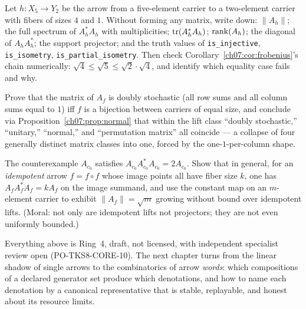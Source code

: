 \begin{exercise}\label{ch07:ex:exercise1}
Let $h:X_5\to Y_2$ be the arrow from a five-element carrier to a two-element
carrier with fibers of sizes $4$ and $1$. Without forming any matrix, write
down: $\lVert A_h\rVert$; the full spectrum of $A_h^*A_h$ with
multiplicities; $\mathrm{tr}(A_h^*A_h)$; $\mathrm{rank}(A_h)$; the diagonal of
$A_hA_h^*$; the support projector; and the truth values of
\texttt{is\_injective}, \texttt{is\_isometry},
\texttt{is\_partial\_isometry}. Then check
Corollary~\ref{ch07:cor:frobenius}'s chain numerically:
$\sqrt{4}\le\sqrt{5}\le\sqrt{2}\cdot\sqrt{4}$, and identify which equality
case fails and why.
\end{exercise}

\begin{exercise}\label{ch07:ex:exercise2}
Prove that the matrix of $A_f$ is doubly stochastic (all row sums and all
column sums equal to $1$) iff $f$ is a bijection between carriers of equal
size, and conclude via Proposition~\ref{ch07:prop:normal} that within the
lift class ``doubly stochastic,'' ``unitary,'' ``normal,'' and
``permutation matrix'' all coincide --- a collapse of four generally
distinct matrix classes into one, forced by the one-$1$-per-column shape.
\end{exercise}

\begin{exercise}\label{ch07:ex:exercise3}
The counterexample $A_{c_0}$ satisfies $A_{c_0}A_{c_0}^*A_{c_0}=2A_{c_0}$.
Show that in general, for an \emph{idempotent} arrow $f=f\circ f$ whose
image points all have fiber size $k$, one has $A_fA_f^*A_f=kA_f$ on the
image summand, and use the constant map on an $m$-element carrier to
exhibit $\lVert A_f\rVert=\sqrt{m}$ growing without bound over idempotent
lifts. (Moral: not only are idempotent lifts not projectors; they are not
even uniformly bounded.)
\end{exercise}

Everything above is Ring~4, draft, not licensed, with independent specialist
review open (PO-TKS8-CORE-10). The next chapter turns from the linear shadow
of single arrows to the combinatorics of arrow \emph{words}: which
compositions of a declared generator set produce which denotations, and how
to name each denotation by a canonical representative that is stable,
replayable, and honest about its resource limits.
